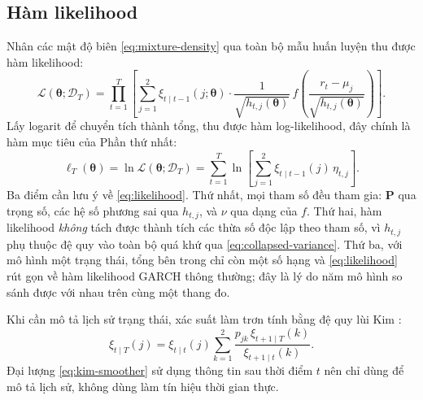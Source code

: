\documentclass[12pt,a4paper]{article}
\numberwithin{equation}{section}
\theoremstyle{definition}
\newcommand{\Data}{\mathcal{D}}
\newcommand{\Param}{\symbf{\theta}}
\newcommand{\Pmat}{\symbf{P}}
\begin{document}
	\subsection{Hàm likelihood}\label{subsec:likelihood}
	Nhân các mật độ biên \eqref{eq:mixture-density} qua toàn bộ mẫu huấn luyện thu được hàm
	likelihood:
	\begin{equation}
		\mathcal{L}(\Param;\Data_T) = \prod_{t=1}^{T} \left[ \sum_{j=1}^{2} \xi_{t\mid t-1}(j;\Param) \cdot \frac{1}{\sqrt{h_{t,j}(\Param)}}\, f\!\left(\frac{r_t-\mu_j}{\sqrt{h_{t,j}(\Param)}}\right) \right].
		\label{eq:likelihood}
	\end{equation}
	Lấy logarit để chuyển tích thành tổng, thu được hàm log-likelihood, đây chính là hàm mục tiêu của
	Phần thứ nhất:
	\begin{equation}
		\ell_T(\Param)=\ln\mathcal{L}(\Param;\Data_T)
		=\sum_{t=1}^{T}\ln\!\left[\sum_{j=1}^{2}\xi_{t\mid t-1}(j)\,\eta_{t,j}\right].
		\label{eq:loglikelihood}
	\end{equation}
	Ba điểm cần lưu ý về \eqref{eq:likelihood}. Thứ nhất, mọi tham số đều tham gia: $\Pmat$
	qua trọng số, các hệ số phương sai qua $h_{t,j}$, và $\nu$ qua dạng của $f$. Thứ hai, hàm
	likelihood \emph{không} tách được thành tích các thừa số độc lập theo tham số, vì
	$h_{t,j}$ phụ thuộc đệ quy vào toàn bộ quá khứ qua \eqref{eq:collapsed-variance}. Thứ ba,
	với mô hình một trạng thái, tổng bên trong chỉ còn một số hạng và \eqref{eq:likelihood}
	rút gọn về hàm likelihood GARCH thông thường; đây là lý do năm mô hình so sánh được
	với nhau trên cùng một thang đo.
	
	Khi cần mô tả lịch sử trạng thái, xác suất làm trơn tính bằng đệ quy lùi Kim
	\cite{kim1994}:
	\begin{equation}
		\xi_{t\mid T}(j)=\xi_{t\mid t}(j)\sum_{k=1}^{2}
		\frac{p_{jk}\,\xi_{t+1\mid T}(k)}{\xi_{t+1\mid t}(k)}.
		\label{eq:kim-smoother}
	\end{equation}
	Đại lượng \eqref{eq:kim-smoother} sử dụng thông tin sau thời điểm $t$ nên chỉ dùng để mô
	tả lịch sử, không dùng làm tín hiệu thời gian thực.
	
\end{document}
